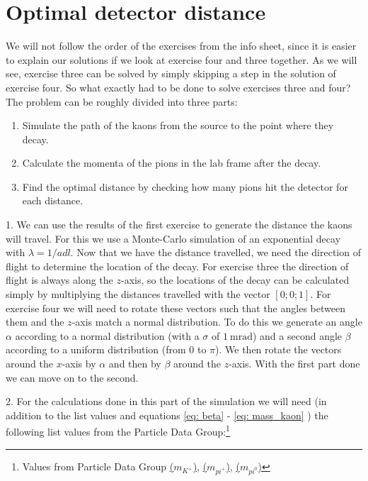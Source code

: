 \documentclass[12pt,a4paper,oneside,english]{article}
\begin{document}
\section{Optimal detector distance}
	We will not follow the order of the exercises from the info sheet, since it is easier to explain our solutions if we look at exercise four and three together. As we will see, exercise three can be solved by simply skipping a step in the solution of exercise four. So what exactly had to be done to solve exercises three and four? The problem can be roughly divided into three parts:
	\begin{enumerate}
	\item Simulate the path of the kaons from the source to the point where they decay.
	\item Calculate the momenta of the pions in the lab frame after the decay.
	\item Find the optimal distance by checking how many pions hit the detector for each distance.
	\end{enumerate}
	
	1. We can use the results of the first exercise to generate the distance the kaons will travel. For this we use a Monte-Carlo simulation of an exponential decay with $\lambda = 1/adl$. Now that we have the distance travelled, we need the direction of flight to determine the location of the decay. For exercise three the direction of flight is always along the $z$-axis, so the locations of the decay can be calculated simply by multiplying the distances travelled with the vector $[0;0;1]$. For exercise four we will need to rotate these vectors such that the angles between them and the $z$-axis match a normal distribution. To do this we generate an angle $\alpha$ according to a normal distribution (with a $\sigma$ of $\SI{1}{\milli\radian}$) and a second angle $\beta$ according to a uniform distribution (from $0$ to $\pi$). We then rotate the vectors around the $x$-axis by $\alpha$ and then by $\beta$ around the $z$-axis.
	With the first part done we can move on to the second.

	
	2. For the calculations done in this part of the simulation we will need (in addition to the list values and equations \ref{eq: beta} - \ref{eq: mass_kaon} ) the following list values
	from the Particle Data Group:\footnote{Values from Particle Data Group \href{http://pdg.lbl.gov/2017/listings/rpp2017-list-K-plus-minus.pdf}{($m_{K^+}$)}, \href{http://pdg.lbl.gov/2017/listings/rpp2017-list-pi-plus-minus.pdf}{($m_{pi^+ }$)}, \href{http://pdg.lbl.gov/2017/listings/rpp2017-list-pi-zero.pdf}{($m_{pi^0 }$)}} 
	
\end{document}
